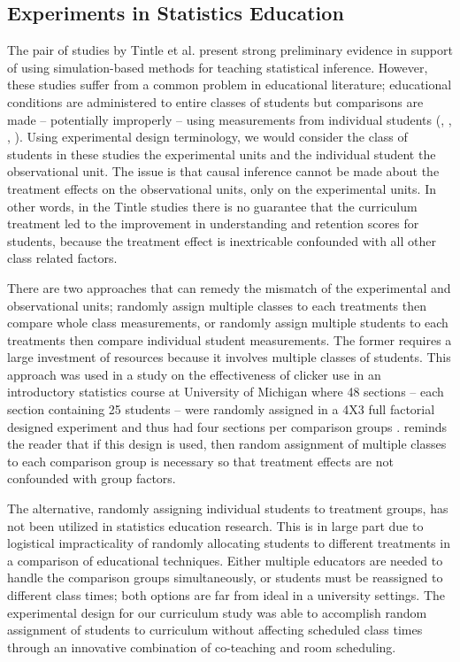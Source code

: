 \documentclass[11pt]{isuthesis}\usepackage[]{graphicx}\usepackage[]{color}
\begin{document}
\subsection{Experiments in Statistics Education} 

The pair of studies by Tintle et al. present strong preliminary evidence in support of using simulation-based methods for teaching statistical inference. However, these studies suffer from a common problem in educational literature; educational conditions are administered to entire classes of students but comparisons are made -- potentially improperly -- using measurements from individual students (\citealt{Ragasa2008}, \citealt{BaglinDaCosta2013}, \citealt{Williams2012}, \citealt{Carlson2011}). Using experimental design terminology, we would consider the class of students in these studies the experimental units and the individual student the observational unit. The issue is that causal inference cannot be made about the treatment effects on the observational units, only on the experimental units.  In other words, in the Tintle studies there is no guarantee that the curriculum treatment led to the improvement in understanding and retention scores for students, because the treatment effect is inextricable confounded with all other class related factors.

There are two approaches that can remedy the mismatch of the experimental and observational units; randomly assign multiple classes to each treatments then compare whole class measurements, or randomly assign multiple students to each treatments then compare individual student measurements. The former requires a large investment of resources because it involves multiple classes of students. This approach was used in a study on the effectiveness of clicker use in an introductory statistics course at University of Michigan where 48 sections -- each section containing 25 students -- were randomly assigned in a 4X3 full factorial designed experiment and thus had four sections per comparison groups \citep{McGowanGunderson2010}. \citet{McGowan2011} reminds the reader that if this design is used, then random assignment of multiple classes to each comparison group is necessary so that treatment effects are not confounded with group factors. 

The alternative, randomly assigning individual students to treatment groups, has not been utilized in statistics education research. This is in large part due to logistical impracticality of randomly allocating students to different treatments in a comparison of educational techniques. Either multiple educators are needed to handle the comparison groups simultaneously, or students must be reassigned to different class times; both options are far from ideal in a university settings. The experimental design for our curriculum study was able to accomplish random assignment of students to curriculum without affecting scheduled class times through an innovative combination of co-teaching and room scheduling.
\end{document}
